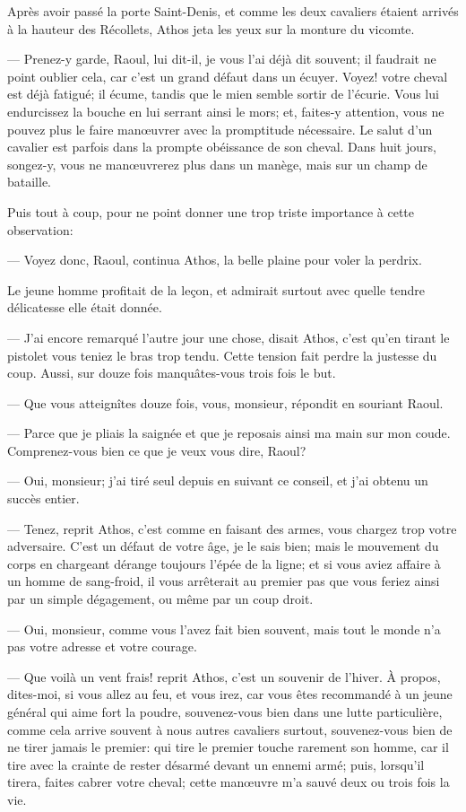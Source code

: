 Après avoir passé la porte Saint-Denis, et comme les deux cavaliers étaient arrivés à la hauteur des Récollets, Athos jeta les yeux sur la monture du vicomte.

— Prenez-y garde, Raoul, lui dit-il, je vous l'ai déjà dit souvent; il faudrait ne point oublier cela, car c'est un grand défaut dans un écuyer. Voyez! votre cheval est déjà fatigué; il écume, tandis que le mien semble sortir de l'écurie. Vous lui endurcissez la bouche en lui serrant ainsi le mors; et, faites-y attention, vous ne pouvez plus le faire manœuvrer avec la promptitude nécessaire. Le salut d'un cavalier est parfois dans la prompte obéissance de son cheval. Dans huit jours, songez-y, vous ne manœuvrerez plus dans un manège, mais sur un champ de bataille.

Puis tout à coup, pour ne point donner une trop triste importance à cette observation:

— Voyez donc, Raoul, continua Athos, la belle plaine pour voler la perdrix.

Le jeune homme profitait de la leçon, et admirait surtout avec quelle tendre délicatesse elle était donnée.

— J'ai encore remarqué l'autre jour une chose, disait Athos, c'est qu'en tirant le pistolet vous teniez le bras trop tendu. Cette tension fait perdre la justesse du coup. Aussi, sur douze fois manquâtes-vous trois fois le but.

— Que vous atteignîtes douze fois, vous, monsieur, répondit en souriant Raoul.

— Parce que je pliais la saignée et que je reposais ainsi ma main sur mon coude. Comprenez-vous bien ce que je veux vous dire, Raoul?

— Oui, monsieur; j'ai tiré seul depuis en suivant ce conseil, et j'ai obtenu un succès entier.

— Tenez, reprit Athos, c'est comme en faisant des armes, vous chargez trop votre adversaire. C'est un défaut de votre âge, je le sais bien; mais le mouvement du corps en chargeant dérange toujours l'épée de la ligne; et si vous aviez affaire à un homme de sang-froid, il vous arrêterait au premier pas que vous feriez ainsi par un simple dégagement, ou même par un coup droit.

— Oui, monsieur, comme vous l'avez fait bien souvent, mais tout le monde n'a pas votre adresse et votre courage.

— Que voilà un vent frais! reprit Athos, c'est un souvenir de l'hiver. À propos, dites-moi, si vous allez au feu, et vous irez, car vous êtes recommandé à un jeune général qui aime fort la poudre, souvenez-vous bien dans une lutte particulière, comme cela arrive souvent à nous autres cavaliers surtout, souvenez-vous bien de ne tirer jamais le premier: qui tire le premier touche rarement son homme, car il tire avec la crainte de rester désarmé devant un ennemi armé; puis, lorsqu'il tirera, faites cabrer votre cheval; cette manœuvre m'a sauvé deux ou trois fois la vie.

